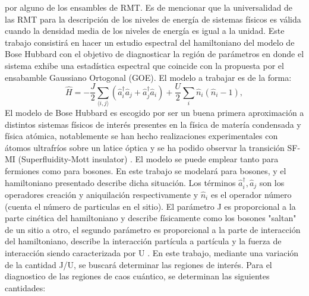 \documentclass[spanish,titlepage,table]{practicas}
\begin{document}
por alguno de los ensambles de RMT.\cite{Atas_2013}
Es de mencionar que la universalidad de las RMT para la descripción de los niveles de energía de sistemas físicos 
es válida cuando la densidad media de los niveles de energía es igual a la unidad. \cite{Atas_2013}
\newline
Este trabajo consistirá en hacer un estudio espectral del hamiltoniano del modelo de Bose Hubbard 
con el objetivo de diagnosticar la región de parámetros en donde el sistema exhibe una estadística espectral 
que coincide con la propuesta por el ensabamble Gaussiano Ortogonal (GOE). El modelo a trabajar es de la forma:
\[
\hat{H}
= -\frac{J}{2} \sum_{\langle i,j\rangle} \!\left(\hat{a}_i^{\dagger}\hat{a}_j + \hat{a}_j^{\dagger}\hat{a}_i\right)
+ \frac{U}{2}\sum_{i}\hat{n}_i(\hat{n}_i - 1),
\]
El modelo de Bose Hubbard es escogido por ser un buena primera aproximación a distintos sistemas físicos de interés presentes en la física de matería condensada y física atómica, notablemente 
se han hecho realizaciones experimentales con átomos ultrafríos sobre un latice óptica y se ha podido observar la transición SF-MI (Superfluidity-Mott insulator) \cite{Zhang2010}. 
El modelo se puede emplear tanto para fermiones como para bosones. En este trabajo se modelará para bosones, y el hamiltoniano presentado describe dicha situación.
Los términos $\hat{a}_i^{\dagger},\hat{a}_j$ son los operadores creación y aniquilación respectivamente y $\hat{n}_i$ es el operador número (cuenta el número de particulas en el sitio).
El parámetro J es proporcional a la parte cinética del hamiltoniano y describe físicamente como los bosones "saltan" de un sitio a otro, el segundo parámetro es proporcional a la parte de interacción del hamiltoniano, describe 
la interacción partícula a partícula y la fuerza de interacción siendo caracterizada por U \cite{Zhang2010}. 
En este trabajo, mediante una variación de la cantidad J/U, se buscará determinar las regiones de interés.
\newline 
Para el diagnostico de las regiones de caos cuántico, se determinan las siguientes cantidades:
\end{document}
